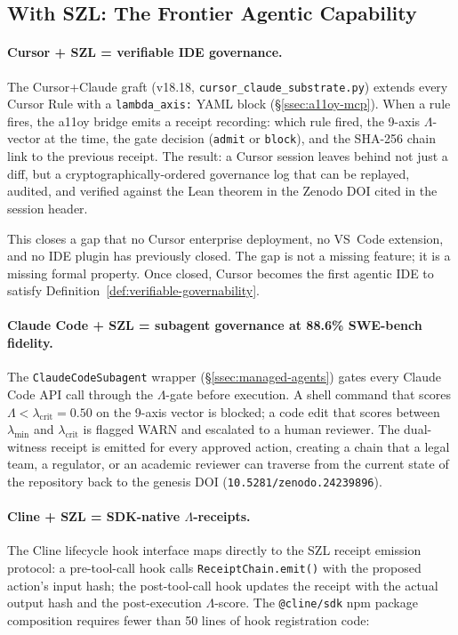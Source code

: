 \subsection{With SZL: The Frontier Agentic Capability}
\label{ssec:with-szl-agentic}

\paragraph{Cursor + SZL = verifiable IDE governance.}
The Cursor+Claude graft (v18.18, \texttt{cursor\_claude\_substrate.py})
extends every Cursor Rule with a \texttt{lambda\_axis:} YAML block
(\S\ref{ssec:a11oy-mcp}).  When a rule fires, the a11oy bridge emits a
receipt recording: which rule fired, the 9-axis $\Lambda$-vector at the
time, the gate decision (\texttt{admit} or \texttt{block}), and the
SHA-256 chain link to the previous receipt.  The result: a Cursor session
leaves behind not just a diff, but a cryptographically-ordered governance
log that can be replayed, audited, and verified against the Lean theorem
in the Zenodo DOI cited in the session header.

This closes a gap that no Cursor enterprise deployment, no VS~Code extension,
and no IDE plugin has previously closed.  The gap is not a missing feature;
it is a missing formal property.  Once closed, Cursor becomes the first
agentic IDE to satisfy Definition~\ref{def:verifiable-governability}.

\paragraph{Claude Code + SZL = subagent governance at 88.6\% SWE-bench fidelity.}
The \texttt{ClaudeCodeSubagent} wrapper (\S\ref{ssec:managed-agents}) gates
every Claude Code API call through the $\Lambda$-gate before execution.  A
shell command that scores $\Lambda < \lambda_{\mathrm{crit}} = 0.50$ on the
9-axis vector is blocked; a code edit that scores between $\lambda_{\min}$
and $\lambda_{\mathrm{crit}}$ is flagged WARN and escalated to a human reviewer.
The dual-witness receipt is emitted for every approved action, creating a chain
that a legal team, a regulator, or an academic reviewer can traverse from the
current state of the repository back to the genesis DOI
(\texttt{10.5281/zenodo.24239896}).

\paragraph{Cline + SZL = SDK-native $\Lambda$-receipts.}
The Cline lifecycle hook interface maps directly to the SZL receipt emission
protocol: a pre-tool-call hook calls \texttt{ReceiptChain.emit()} with the
proposed action's input hash; the post-tool-call hook updates the receipt with
the actual output hash and the post-execution $\Lambda$-score.  The
\texttt{@cline/sdk} npm package composition requires fewer than 50 lines of
hook registration code:

